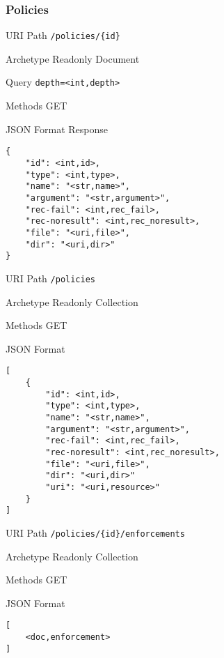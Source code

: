 \documentclass[10pt,a4paper]{scrartcl}
\begin{document}
\pagebreak
\subsubsection{Policies}

\begin{mdframed}[style=def]
\begin{description*}
	\item[URI Path] \texttt{/policies/\{id\}}
	\item[Archetype] Readonly Document
	\item[Query] \texttt{depth=<int,depth>}
	\item[Methods] GET
	\item[JSON Format Response] \hfill
\begin{lstlisting}
{
	"id": <int,id>,
	"type": <int,type>,
	"name": "<str,name>",
	"argument": "<str,argument>",
	"rec-fail": <int,rec_fail>,
	"rec-noresult": <int,rec_noresult>, 
	"file": "<uri,file>",
	"dir": "<uri,dir>"
}
\end{lstlisting}
\end{description*}
\end{mdframed}

\begin{mdframed}[style=def]
\begin{description*}
	\item[URI Path] \texttt{/policies}
	\item[Archetype] Readonly Collection
	\item[Methods] GET
	\item[JSON Format] \hfill
\begin{lstlisting}
[
	{
		"id": <int,id>,
		"type": <int,type>,
		"name": "<str,name>",
		"argument": "<str,argument>",
		"rec-fail": <int,rec_fail>,
		"rec-noresult": <int,rec_noresult>, 
		"file": "<uri,file>",
		"dir": "<uri,dir>"	
		"uri": "<uri,resource>"
	}
]
\end{lstlisting}
\end{description*}
\end{mdframed}

\begin{mdframed}[style=def]
\begin{description*}
	\item[URI Path] \texttt{/policies/\{id\}/enforcements}
	\item[Archetype] Readonly Collection
	\item[Methods] GET
	\item[JSON Format] \hfill
\begin{lstlisting}
[
	<doc,enforcement>
]
\end{lstlisting}
\end{description*}
\end{mdframed}
\end{document}
